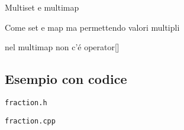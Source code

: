 \documentclass[xcolor={dvipsnames, svgnames, x11names, table}, 10pt]{beamer}
\begin{document}
\begin{frame}[fragile]{Multiset e multimap}

Come set e map ma permettendo valori multipli

nel multimap non c'é operator[]

\end{frame}

\subsection{Esempio con codice}

\begin{frame}{\texttt{fraction.h}}

    
\end{frame}

\begin{frame}{\texttt{fraction.cpp}}
    
    
\end{frame}

\Riconoscimenti
\end{document}
